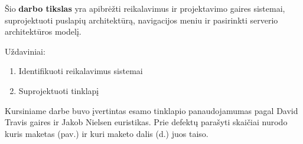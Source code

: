 \documentclass{VUMIFPSkursinis}
\begin{document}
Šio \textbf{darbo tikslas} yra apibrėžti reikalavimus ir projektavimo gaires sistemai, suprojektuoti puslapių architektūrą, navigacijos meniu ir pasirinkti serverio architektūros modelį. 

Uždaviniai:
\begin{enumerate}
	\item Identifikuoti reikalavimus sistemai
	\item Suprojektuoti tinklapį
\end{enumerate}

Kursiniame darbe buvo įvertintas esamo tinklapio panaudojamumas\cite{Kursinis} pagal David Travis gaires\cite{SearchGuidelinesEn}\cite{NavigationAndIAGuidelinesEn} ir Jakob Nielsen euristikas\cite{NielsenHeuristicsEn}. Prie defektų parašyti skaičiai nurodo kuris maketas (pav.) ir kuri maketo dalis (d.) juos taiso.
\end{document}
